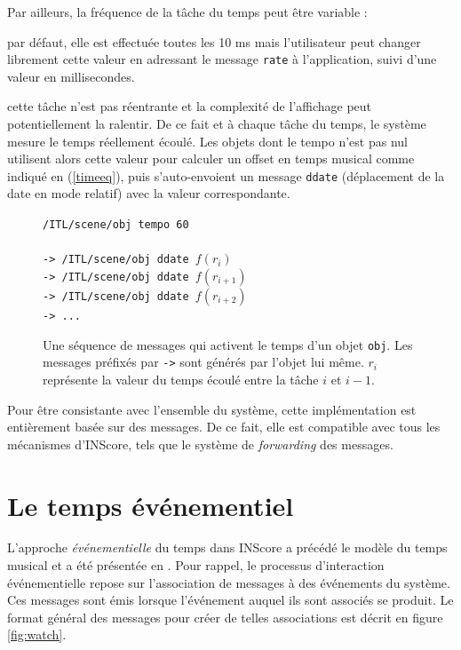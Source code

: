 \documentclass{article}
\newcommand{\OSC}[1]	{{\fontsize{9pt}{9pt} \selectfont\texttt{#1}}}
\let\olditemize\itemize
\let\oldenditemize\enditemize
\renewenvironment{itemize} 	{\olditemize \renewcommand{\labelitemi}{$\bullet$} \setlength{\itemsep}{0mm}}{\oldenditemize}
\newcommand{\sample}[1]		{\vspace{-0.2em}\begin{center}\colorbox{mygrey}{\begin{minipage}[t]{0.98\columnwidth} {\small \texttt{#1}}\end{minipage}}\end{center}}
\begin{document}
Par ailleurs, la fréquence de la tâche du temps peut être variable : 
\begin{itemize}
\item par défaut, elle est effectuée toutes les 10 ms mais l'utilisateur peut changer librement cette valeur en adressant le message \OSC{rate} à l'application, suivi d'une valeur en millisecondes.
\item cette tâche n'est pas réentrante et la complexité de l'affichage peut potentiellement la ralentir.
\end{itemize}
De ce fait et à chaque tâche du temps, le système mesure le temps réellement écoulé. Les objets dont le tempo n'est pas nul utilisent alors cette valeur pour calculer un offset en temps musical comme indiqué en (\ref{timeeq}), puis s'auto-envoient un message \OSC{ddate} (déplacement de la date en mode relatif) avec la valeur correspondante.

\begin{figure}[h]
   \centering
   \sample{/ITL/scene/obj tempo 60 \\
   \\
-> /ITL/scene/obj ddate $f(r_i)$ \\
-> /ITL/scene/obj ddate $f(r_{i+1})$ \\
-> /ITL/scene/obj ddate $f(r_{i+2})$ \\
-> ...
}
   \caption{Une séquence de messages qui activent le temps d'un objet \OSC{obj}. Les messages préfixés par \OSC{->} sont générés par l'objet lui même. $r_{i}$ représente la valeur du temps écoulé entre la tâche $i$ et $i-1$.}
   \label{fig:tempo}
\end{figure}

Pour être consistante avec l'ensemble du système, cette implémentation est entièrement basée sur des messages. De ce fait, elle est compatible avec tous les mécanismes d'INScore, tels que le système de \emph{forwarding} des messages. 


\section{Le temps événementiel}\label{evtime}

L'approche \emph{événementielle} du temps dans INScore a précédé le modèle du temps musical et a été présentée en \cite{fober13a}. Pour rappel, le processus d'interaction événementielle repose sur l'association de messages à des événements du système. Ces messages sont émis lorsque l'événement auquel ils sont associés se produit. Le format général des messages pour créer de telles associations est décrit en figure \ref{fig:watch}.
\end{document}
